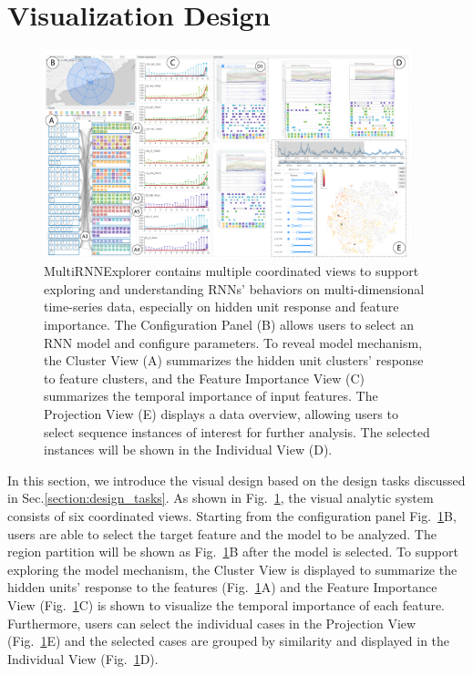 \section{Visualization Design}
\begin{figure}[t]
	\centering
    \includegraphics[width=0.95\textwidth]{pictures/teaser.pdf}
	\vspace{-3mm}
	\caption{MultiRNNExplorer contains multiple coordinated views to support exploring and understanding RNNs' behaviors on multi-dimensional time-series data, especially on hidden unit response and feature importance. The Configuration Panel (B) allows users to select an RNN model and configure parameters.  To reveal model mechanism, the Cluster View (A) summarizes the hidden unit clusters' response to feature clusters, and the Feature Importance View (C) summarizes the temporal importance of input features.  The Projection View (E) displays a data overview, allowing users to select sequence instances of interest for further analysis.  The selected instances will be shown in the Individual View (D).}
	\label{fig:teaser}
	\vspace{-4mm}
\end{figure}


In this section, we introduce the visual design based on the design tasks discussed in Sec.\ref{section:design_tasks}.  As shown in Fig.~\ref{fig:teaser}, the visual analytic system consists of six coordinated views. Starting from the configuration panel Fig.~\ref{fig:teaser}B, users are able to select the target feature and the model to be analyzed. The region partition will be shown as Fig.~\ref{fig:teaser}B after the model is selected. To support exploring the model mechanism, the Cluster View is displayed to summarize the hidden units' response to the features (Fig.~\ref{fig:teaser}A) and the Feature Importance View (Fig.~\ref{fig:teaser}C) is shown to visualize the temporal importance of each feature. Furthermore, users can select the individual cases in the Projection View (Fig.~\ref{fig:teaser}E) and the selected cases are grouped by similarity and displayed in the Individual View (Fig.~\ref{fig:teaser}D).






